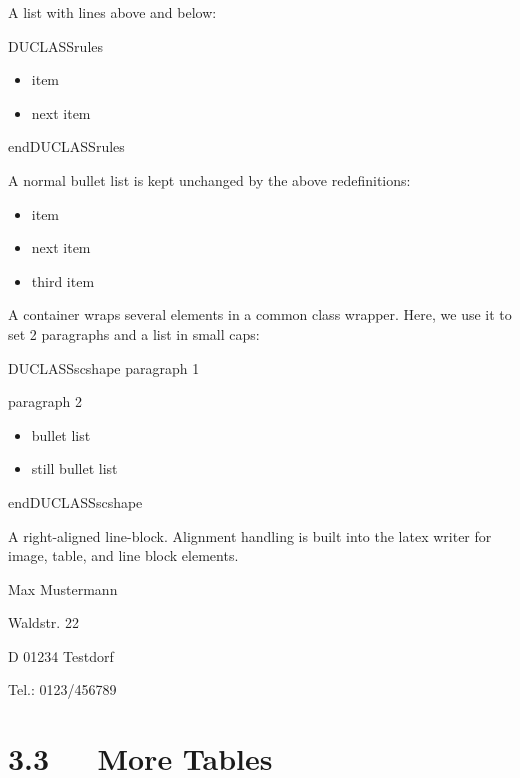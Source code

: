 \documentclass[a4paper]{memoir}
\newenvironment{DUclass}[1]%
  {%
   \def\DocutilsClassFunctionName{DUCLASS#1}
     \csname \DocutilsClassFunctionName \endcsname}%
  {\csname end\DocutilsClassFunctionName \endcsname}%
\newenvironment{DUlineblock}[1]{%
    \list{}{\setlength{\partopsep}{\parskip}
            \addtolength{\partopsep}{\baselineskip}
            \setlength{\topsep}{0pt}
            \setlength{\itemsep}{0.15\baselineskip}
            \setlength{\parsep}{0pt}
            \setlength{\leftmargin}{#1}}
    \raggedright
  }
  {\endlist}
\begin{document}
A list with lines above and below:

\begin{DUclass}{rules}
\begin{itemize}
\item item

\item next item
\end{itemize}
\end{DUclass}

A normal bullet list is kept unchanged by the above redefinitions:

\begin{itemize}
\item item

\item next item

\item third item
\end{itemize}

A container wraps several elements in a common \textquotedbl{}class wrapper\textquotedbl{}. Here, we use
it to set 2 paragraphs and a list in small caps:

\newcommand*{\DUCLASSscshape}{\scshape}

\begin{DUclass}{scshape}
paragraph 1

paragraph 2

\begin{itemize}
\item bullet list

\item still bullet list
\end{itemize}
\end{DUclass}

A right-aligned line-block. Alignment handling is built into the latex
writer for image, table, and line block elements.

\begin{DUlineblock}{0em}
\raggedleft
\item[] Max Mustermann
\item[] Waldstr. 22
\item[] D 01234 Testdorf
\item[] Tel.: 0123/456789
\end{DUlineblock}


\section{3.3   More Tables%
  \label{more-tables}%
}
\end{document}
